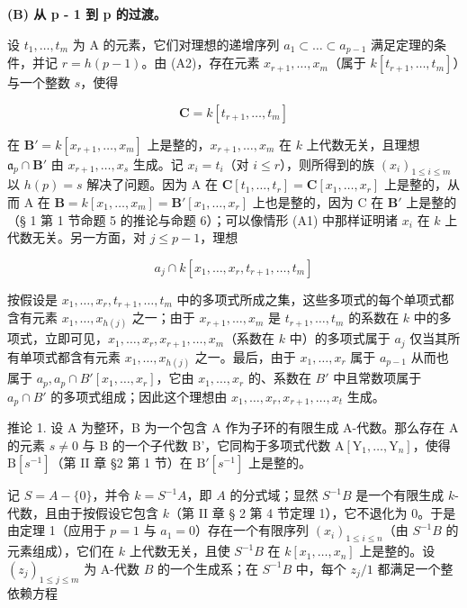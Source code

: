 \textbf{(B) 从 p - 1 到 p 的过渡。}\par

设 \(t_1, \ldots, t_m\) 为 A 的元素，它们对理想的递增序列 \(a_1 \subset \ldots \subset a_{p-1}\) 满足定理的条件，并记 \(r = h(p - 1)\)。由 (A2)，存在元素 \(x_{r+1}, \ldots, x_m\)（属于 \(k[t_{r+1}, \ldots, t_m]\)）与一个整数 \(s\)，使得

\[
\mathbf {C} = k [ t _ {r + 1}, \dots , t _ {m} ]
\]

在 \(\mathbf{B}' = k[x_{r+1},\ldots,x_m]\) 上是整的，\(x_{r+1},\ldots,x_m\) 在 \(k\) 上代数无关，且理想 \(\mathfrak{a}_p\cap\mathbf{B}'\) 由 \(x_{r+1},\ldots,x_s\) 生成。记 \(x_i=t_i\)（对 \(i\leqslant r\)），则所得到的族 \((x_i)_{1\leqslant i\leqslant m}\) 以 \(h(p)=s\) 解决了问题。因为 A 在 \(\mathbf{C}[t_1,\ldots,t_r]=\mathbf{C}[x_1,\ldots,x_r]\) 上是整的，从而 A 在 \(\mathbf{B}=k[x_1,\ldots,x_m]=\mathbf{B}'[x_1,\ldots,x_r]\) 上也是整的，因为 C 在 \(\mathbf{B}'\) 上是整的（§ 1 第 1 节命题 5 的推论与命题 6）；可以像情形 (A1) 中那样证明诸 \(x_i\) 在 \(k\) 上代数无关。另一方面，对 \(j\leqslant p-1\)，理想

\[
a _ {j} \cap k [ x _ {1}, \dots , x _ {r}, t _ {r + 1}, \dots , t _ {m} ]
\]

按假设是 \(x_1, \ldots, x_r, t_{r+1}, \ldots, t_m\) 中的多项式所成之集，这些多项式的每个单项式都含有元素 \(x_1, \ldots, x_{h(j)}\) 之一；由于 \(x_{r+1}, \ldots, x_m\) 是 \(t_{r+1}, \ldots, t_m\) 的系数在 \(k\) 中的多项式，立即可见，\(x_1, \ldots, x_r, x_{r+1}, \ldots, x_m\)（系数在 \(k\) 中）的多项式属于 \(a_j\) 仅当其所有单项式都含有元素 \(x_1, \ldots, x_{h(j)}\) 之一。最后，由于 \(x_1, \ldots, x_r\) 属于 \(a_{p-1}\) 从而也属于 \(a_p, a_p \cap B'[x_1, \ldots, x_r]\)，它由 \(x_1, \ldots, x_r\) 的、系数在 \(B'\) 中且常数项属于 \(a_p \cap B'\) 的多项式组成；因此这个理想由 \(x_1, \ldots, x_r, x_{r+1}, \ldots, x_t\) 生成。

推论 1. 设 A 为整环，B 为一个包含 A 作为子环的有限生成 A-代数。那么存在 A 的元素 \(s \neq 0\) 与 B 的一个子代数 B'，它同构于多项式代数 \(\mathrm{A}[\mathrm{Y}_{1}, \ldots, \mathrm{Y}_{n}]\)，使得 \(\mathrm{B}[s^{-1}]\)（第 II 章 §2 第 1 节）在 \(\mathrm{B}'[s^{-1}]\) 上是整的。

记 \(S = A - \{0\}\)，并令 \(k = S^{-1}A\)，即 \(A\) 的分式域；显然 \(S^{-1}B\) 是一个有限生成 \(k\)-代数，且由于按假设它包含 \(k\)（第 II 章 § 2 第 4 节定理 1），它不退化为 0。于是由定理 1（应用于 \(p = 1\) 与 \(a_1 = 0\)）存在一个有限序列 \((x_i)_{1 \leqslant i \leqslant n}\)（由 \(S^{-1}B\) 的元素组成），它们在 \(k\) 上代数无关，且使 \(S^{-1}B\) 在 \(k[x_1, \ldots, x_n]\) 上是整的。设 \((z_j)_{1 \leqslant j \leqslant m}\) 为 A-代数 \(B\) 的一个生成系；在 \(S^{-1}B\) 中，每个 \(z_j/1\) 都满足一个整依赖方程

